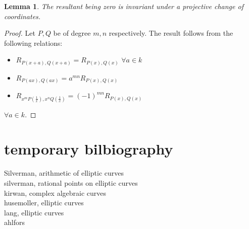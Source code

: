 \documentclass{article}
\newtheorem*{lemma*}{Lemma}
\theoremstyle{remark}
\begin{document}
\begin{lemma*} 
The resultant being zero is invariant under a projective change of coordinates.
\end{lemma*}
\begin{proof}
Let  $P,Q$ be of degree $m,n$ respectively. The result follows from the following relations:
\begin{itemize}
\item $R_{P(x+a),Q(x+a)}=R_{P(x),Q(x)}$ $\forall a\in k$
\item $R_{P(ax),Q(ax)}=a^{mn}R_{P(x),Q(x)}$
\item $R_{x^mP(\frac{1}{x}),x^nQ(\frac{1}{x})}=(-1)^{mn}R_{P(x),Q(x)}$
\end{itemize}
$\forall a\in k$.
\end{proof}

\section{temporary bilbiography}
Silverman, arithmetic of elliptic curves\\
silverman, rational points on elliptic curves\\
kirwan, complex algebraic curves\\
husemoller, elliptic curves\\
lang, elliptic curves\\
ahlfors
\end{document}
